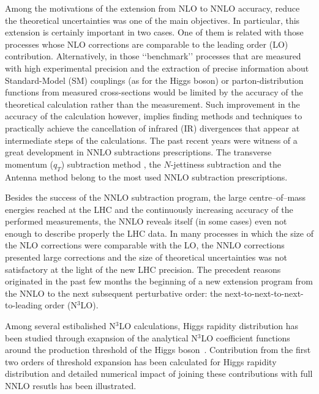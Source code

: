 \documentclass[12pt]{article}
\begin{document}
Among the motivations of the extension from NLO to NNLO accuracy, reduce the theoretical uncertainties was one of the main objectives. In particular, this extension is certainly important in two cases. One of them is related with those processes whose NLO corrections are comparable to the leading order (LO) contribution. Alternatively, in those \lq{}\lq benchmark\rq{}\rq{} processes that are measured with high experimental precision and the extraction of precise information about Standard-Model (SM) couplings (as for the Higgs boson) or parton-distribution functions from measured cross-sections would be limited by the accuracy of the theoretical calculation rather than the measurement. Such improvement in the accuracy of the calculation however, implies finding methods and techniques to practically achieve the cancellation of infrared (IR) divergences that appear at intermediate steps of the calculations. The past recent years were witness of a great development in NNLO subtractions prescriptions. The transverse momentum ($q_{T}$) subtraction method \cite{Catani:2007vq,Bozzi:2005wk,Bozzi:2003jy}, the $N$-jettiness subtraction \cite{Boughezal:2015dva, Gaunt:2015pea} and the Antenna method  \cite{Antenna:method} belong to the most used NNLO subtraction prescriptions. 

Besides the success of the NNLO subtraction program, the large centre--of--mass energies reached at the LHC and the continuously increasing accuracy of the performed measurements, the NNLO reveals itself (in some cases) even not enough to describe properly the LHC data. In many processes in which the size of the NLO corrections were comparable with the LO, the NNLO corrections presented large corrections and the size of theoretical uncertainties was not satisfactory at the light of the new LHC precision. The precedent reasons originated  in the past few months the beginning of a new extension program from the NNLO to the next subsequent perturbative order: the next-to-next-to-next-to-leading order (N$^{3}$LO).

Among several estibalished N$^3$LO calculations, Higgs rapidity distribution has been studied through exapnsion of the analytical N$^3$LO coefficient functions around the production threshold of the Higgs boson~\cite{Dulat:2017prg}. Contribution from the first two orders of threshold expansion has been calculated for Higgs rapidity distribution and detailed numerical impact of joining these contributions with full NNLO resutls has been illustrated. 
\end{document}
